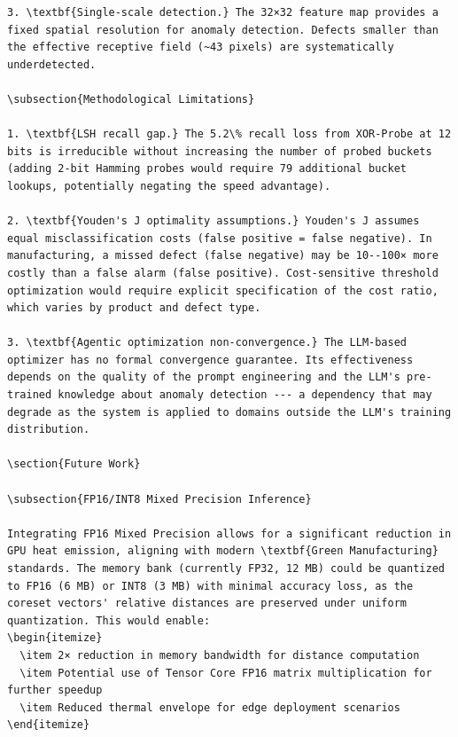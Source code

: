 \documentclass[12pt,a4paper,oneside]{report}
\begin{document}
\begin{verbatim}
3. \textbf{Single-scale detection.} The 32×32 feature map provides a fixed spatial resolution for anomaly detection. Defects smaller than the effective receptive field (~43 pixels) are systematically underdetected.

\subsection{Methodological Limitations}

1. \textbf{LSH recall gap.} The 5.2\% recall loss from XOR-Probe at 12 bits is irreducible without increasing the number of probed buckets (adding 2-bit Hamming probes would require 79 additional bucket lookups, potentially negating the speed advantage).

2. \textbf{Youden's J optimality assumptions.} Youden's J assumes equal misclassification costs (false positive = false negative). In manufacturing, a missed defect (false negative) may be 10--100× more costly than a false alarm (false positive). Cost-sensitive threshold optimization would require explicit specification of the cost ratio, which varies by product and defect type.

3. \textbf{Agentic optimization non-convergence.} The LLM-based optimizer has no formal convergence guarantee. Its effectiveness depends on the quality of the prompt engineering and the LLM's pre-trained knowledge about anomaly detection --- a dependency that may degrade as the system is applied to domains outside the LLM's training distribution.

\section{Future Work}

\subsection{FP16/INT8 Mixed Precision Inference}

Integrating FP16 Mixed Precision allows for a significant reduction in GPU heat emission, aligning with modern \textbf{Green Manufacturing} standards. The memory bank (currently FP32, 12 MB) could be quantized to FP16 (6 MB) or INT8 (3 MB) with minimal accuracy loss, as the coreset vectors' relative distances are preserved under uniform quantization. This would enable:
\begin{itemize}
  \item 2× reduction in memory bandwidth for distance computation
  \item Potential use of Tensor Core FP16 matrix multiplication for further speedup
  \item Reduced thermal envelope for edge deployment scenarios
\end{itemize}

\end{verbatim}
\end{document}
